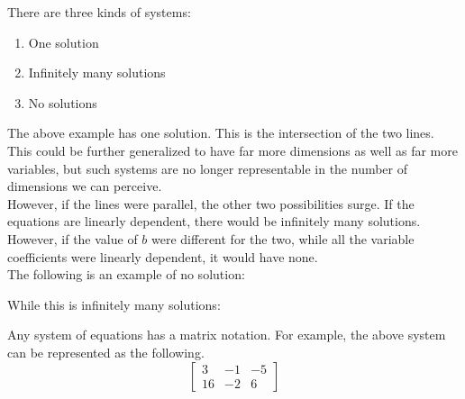 \documentclass[nobib]{tufte-handout}
\begin{document}
There are three kinds of systems:
\begin{enumerate}
    \item One solution
    \item Infinitely many solutions
    \item No solutions
\end{enumerate}
The above example has one solution. This is the intersection of the two lines. This could be further generalized to have far more dimensions as well as far more variables, but such systems are no longer representable in the number of dimensions we can perceive.\\
However, if the lines were parallel, the other two possibilities surge. If the equations are linearly dependent, there would be infinitely many solutions. However, if the value of $b$ were different for the two, while all the variable coefficients were linearly dependent, it would have none.\\
The following is an example of no solution:
\begin{center}
\end{center}
While this is infinitely many solutions:
\begin{center}
\end{center}
Any system of equations has a matrix notation. For example, the above system can be represented as the following.\\
\begin{equation*}
  \begin{bmatrix}
    3 & -1 & -5\\
    16 & -2 & 6
 \end{bmatrix}  
\end{equation*}
\end{document}
